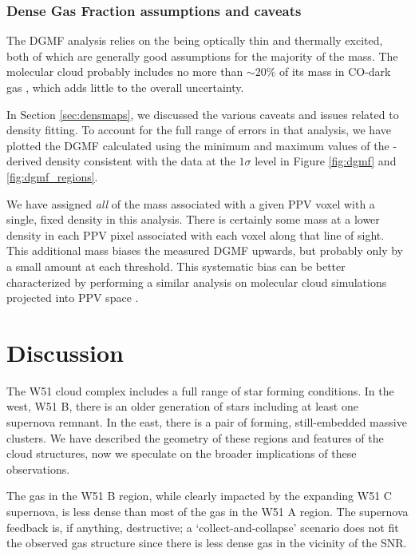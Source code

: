 \subsubsection{Dense Gas Fraction assumptions and caveats}

The DGMF analysis relies on the \thirteenco being optically thin and thermally
excited, both of which are generally good assumptions for the majority of the
mass.  The molecular cloud probably includes no more than $\sim20\%$ of its mass
in CO-dark gas \citep{Pineda2013a,Langer2013a,Smith2014b}, which adds little to
the overall uncertainty.   

In Section \ref{sec:densmaps}, we discussed the various caveats and issues
related to \formaldehyde density fitting.  To account for the full range of
errors in that analysis, we have plotted the DGMF calculated using the minimum
and maximum values of the \formaldehyde-derived density consistent with the
data at the $1\sigma$ level in Figure \ref{fig:dgmf} and
\ref{fig:dgmf_regions}.

We have assigned \emph{all} of the mass associated with a given PPV voxel with
a single, fixed density in this analysis.  There is certainly some mass at a
lower density in each PPV pixel associated with each voxel along that line of
sight.  This additional mass biases the measured DGMF upwards,
but probably only by a small amount at each
threshold.  This systematic bias can be better characterized by performing a
similar analysis on molecular cloud simulations projected into PPV space
\citep[as demonstrated for other analysis techniques by][]{Beaumont2013a}.


\section{Discussion}
\label{sec:discussion}
The W51 cloud complex includes a full range of star forming conditions.  In the
west, W51 B, there is an older generation of stars including at least one supernova
remnant.  In the east, there is a pair of forming, still-embedded massive clusters.
We have described the geometry of these regions and features of the cloud structures,
now we speculate on the broader implications of these observations.

The gas in the W51 B region, while clearly impacted by the expanding W51 C
supernova, is less dense than most of the gas in the W51 A region.  The
supernova feedback is, if anything, destructive; a `collect-and-collapse'
scenario does not fit the observed gas structure since there is less dense
gas in the vicinity of the SNR.  

